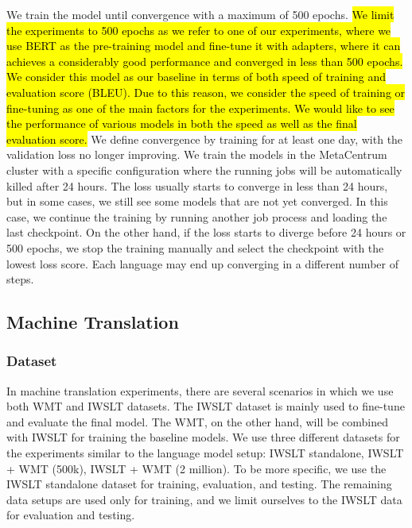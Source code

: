 We train the model until convergence with a maximum of 500 epochs. \hl{We limit the experiments to 500 epochs as we refer to one of our experiments, where we use BERT as the pre-training model and fine-tune it with adapters, where it can achieves a considerably good performance and converged in less than 500 epochs. We consider this model as our baseline in terms of both speed of training and evaluation score (BLEU). Due to this reason, we consider the speed of training or fine-tuning as one of the main factors for the experiments. We would like to see the performance of various models in both the speed as well as the final evaluation score.}
We define convergence by training for at least one day, with the validation loss no longer improving. We train the models in the MetaCentrum cluster with a specific configuration where the running jobs will be automatically killed after 24 hours. The loss usually starts to converge in less than 24 hours, but in some cases, we still see some models that are not yet converged. In this case, we continue the training by running another job process and loading the last checkpoint. On the other hand, if the loss starts to diverge before 24 hours or 500 epochs, we stop the training manually and select the checkpoint with the lowest loss score. Each language may end up converging in a different number of steps.

\subsection{Machine Translation}
\subsubsection{Dataset}
In machine translation experiments, there are several scenarios in which we use both WMT and IWSLT datasets. The IWSLT dataset is mainly used to fine-tune and evaluate the final model. The WMT, on the other hand, will be combined with IWSLT for training the baseline models. We use three different datasets for the experiments similar to the language model setup: IWSLT standalone, IWSLT + WMT (500k), IWSLT + WMT (2 million). To be more specific, we use the IWSLT standalone dataset for training, evaluation, and testing. The remaining data setups are used only for training, and we limit ourselves to the IWSLT data for evaluation and testing.

